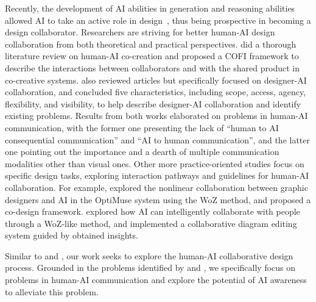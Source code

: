Recently, the development of AI abilities in generation and reasoning abilities~\cite{Wang2024ModaVerse, Edwards2024Sketch2Prototype} allowed AI to take an active role in design~\cite{Li2023Impression}, thus being prospective in becoming a design collaborator. Researchers are striving for better human-AI design collaboration from both theoretical and practical perspectives. \citet{Rezwana2023COFI} did a thorough literature review on human-AI co-creation and proposed a COFI framework to describe the interactions between collaborators and with the shared product in co-creative systems. \citet{Shi2023Understanding} also reviewed articles but specifically focused on designer-AI collaboration, and concluded five characteristics, including scope, access, agency, flexibility, and visibility, to help describe designer-AI collaboration and identify existing problems. Results from both works elaborated on problems in human-AI communication, with the former one presenting the lack of ``human to AI consequential communication'' and ``AI to human communication'', and the latter one pointing out the importance and a dearth of multiple communication modalities other than visual ones. Other more practice-oriented studies focus on specific design tasks, exploring interaction pathways and guidelines for human-AI collaboration. For example, \citet{Zhou2024Understanding} explored the nonlinear collaboration between graphic designers and AI in the OptiMuse system using the WoZ method, and proposed a co-design framework. \citet{Pan2023Diagrams} explored how AI can intelligently collaborate with people through a WoZ-like method, and implemented a collaborative diagram editing system guided by obtained insights.

Similar to \citet{Zhou2024Understanding} and \citet{Pan2023Diagrams}, our work seeks to explore the human-AI collaborative design process. Grounded in the problems identified by \citet{Rezwana2023COFI} and \citet{Shi2023Understanding}, we specifically focus on problems in human-AI communication and explore the potential of AI awareness to alleviate this problem.

